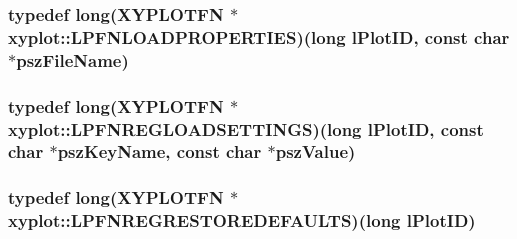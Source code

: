 \hypertarget{namespacexyplot_a5fcef3c2ef35e0f543cb6e0489566a41}{
\subsubsection[{L\-P\-F\-N\-L\-O\-A\-D\-P\-R\-O\-P\-E\-R\-T\-I\-E\-S}]{\setlength{\rightskip}{0pt plus 5cm}typedef {\bf long}({\bf X\-Y\-P\-L\-O\-T\-F\-N} $\ast$ xyplot\-::\-L\-P\-F\-N\-L\-O\-A\-D\-P\-R\-O\-P\-E\-R\-T\-I\-E\-S)({\bf long} l\-Plot\-I\-D, const char $\ast$psz\-File\-Name)}}\label{namespacexyplot_a5fcef3c2ef35e0f543cb6e0489566a41}
\hypertarget{namespacexyplot_a2f14b7c1bf6f824f039dd8cafcd19f20}{
\subsubsection[{L\-P\-F\-N\-R\-E\-G\-L\-O\-A\-D\-S\-E\-T\-T\-I\-N\-G\-S}]{\setlength{\rightskip}{0pt plus 5cm}typedef {\bf long}({\bf X\-Y\-P\-L\-O\-T\-F\-N} $\ast$ xyplot\-::\-L\-P\-F\-N\-R\-E\-G\-L\-O\-A\-D\-S\-E\-T\-T\-I\-N\-G\-S)({\bf long} l\-Plot\-I\-D, const char $\ast$psz\-Key\-Name, const char $\ast$psz\-Value)}}\label{namespacexyplot_a2f14b7c1bf6f824f039dd8cafcd19f20}
\hypertarget{namespacexyplot_a4b16720b36f41b782b9c112b406d9698}{
\subsubsection[{L\-P\-F\-N\-R\-E\-G\-R\-E\-S\-T\-O\-R\-E\-D\-E\-F\-A\-U\-L\-T\-S}]{\setlength{\rightskip}{0pt plus 5cm}typedef {\bf long}({\bf X\-Y\-P\-L\-O\-T\-F\-N} $\ast$ xyplot\-::\-L\-P\-F\-N\-R\-E\-G\-R\-E\-S\-T\-O\-R\-E\-D\-E\-F\-A\-U\-L\-T\-S)({\bf long} l\-Plot\-I\-D)}}\label{namespacexyplot_a4b16720b36f41b782b9c112b406d9698}
